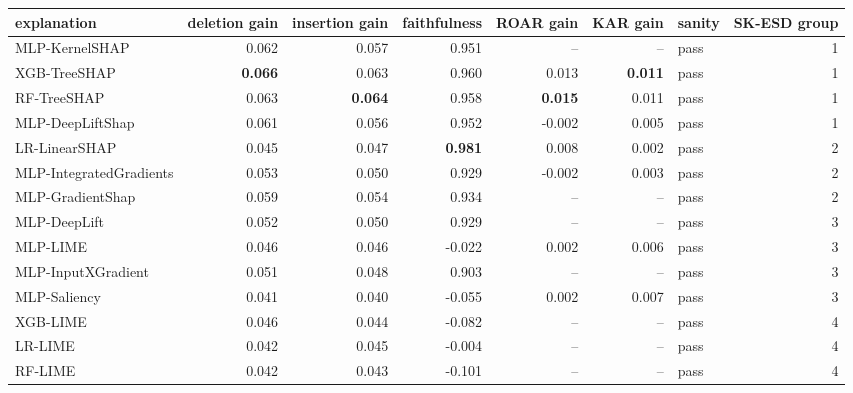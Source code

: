 \small
\begin{tabular}{lrrrrrlr}
\toprule
explanation & deletion gain & insertion gain & faithfulness & ROAR gain & KAR gain & sanity & SK-ESD group \\
\midrule
MLP-KernelSHAP & 0.062 & 0.057 & 0.951 & -- & -- & pass & 1 \\
XGB-TreeSHAP & \textbf{0.066} & 0.063 & 0.960 & 0.013 & \textbf{0.011} & pass & 1 \\
RF-TreeSHAP & 0.063 & \textbf{0.064} & 0.958 & \textbf{0.015} & 0.011 & pass & 1 \\
MLP-DeepLiftShap & 0.061 & 0.056 & 0.952 & -0.002 & 0.005 & pass & 1 \\
LR-LinearSHAP & 0.045 & 0.047 & \textbf{0.981} & 0.008 & 0.002 & pass & 2 \\
MLP-IntegratedGradients & 0.053 & 0.050 & 0.929 & -0.002 & 0.003 & pass & 2 \\
MLP-GradientShap & 0.059 & 0.054 & 0.934 & -- & -- & pass & 2 \\
MLP-DeepLift & 0.052 & 0.050 & 0.929 & -- & -- & pass & 3 \\
MLP-LIME & 0.046 & 0.046 & -0.022 & 0.002 & 0.006 & pass & 3 \\
MLP-InputXGradient & 0.051 & 0.048 & 0.903 & -- & -- & pass & 3 \\
MLP-Saliency & 0.041 & 0.040 & -0.055 & 0.002 & 0.007 & pass & 3 \\
XGB-LIME & 0.046 & 0.044 & -0.082 & -- & -- & pass & 4 \\
LR-LIME & 0.042 & 0.045 & -0.004 & -- & -- & pass & 4 \\
RF-LIME & 0.042 & 0.043 & -0.101 & -- & -- & pass & 4 \\
\bottomrule
\end{tabular}
